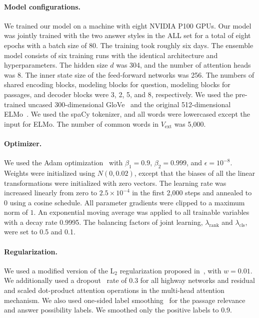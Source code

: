 \documentclass[11pt,a4paper]{article}
\theoremstyle{mydef}
\theoremstyle{myprob}
\begin{document}
\paragraph{Model configurations.}
We trained our model on a machine with eight NVIDIA P100 GPUs. Our model was jointly trained with the two answer styles in the ALL set for a total of eight epochs with a batch size of 80. The training took roughly six days.  The ensemble model consists of six training runs with the identical architecture and hyperparameters.
The hidden size $d$ was 304, and the number of attention heads was 8. The inner state size of the feed-forward networks was 256. The numbers of shared encoding blocks, modeling blocks for question, modeling blocks for passages, and decoder blocks were 3, 2, 5, and 8, respectively. We used the pre-trained uncased 300-dimensional 
GloVe~\citep{PenningtonSM14}
and the original 512-dimensional 
ELMo~\citep{PetersNIGCLZ18}.
We used the spaCy tokenizer, and all words were lowercased except the input for ELMo. The number of common words 
in $V_\mathrm{ext}$
was 5,000.

\paragraph{Optimizer.}
We used the Adam optimization~\citep{KingmaB15} with $\beta_1 = 0.9$, $\beta_2 = 0.999$, and $\epsilon = 10^{-8}$. Weights were initialized using $N(0, 0.02)$, except that the biases of all the linear transformations were initialized with zero vectors. The learning rate was increased linearly from zero to $2.5 \times 10^{-4}$ in the first 2,000 steps and annealed to 0 using a cosine schedule. All parameter gradients were clipped to a maximum norm of $1$. An exponential moving average was applied to all trainable variables with a decay rate 0.9995. The balancing factors of joint learning, $\lambda_\mathrm{rank}$ and $\lambda_\mathrm{cls}$, were set to 0.5 and 0.1.

\paragraph{Regularization.}

We used a modified version of the L$_2$ regularization proposed in~\citep{LoshchilovH17}, with $w = 0.01$.
We additionally used a dropout~\citep{SrivastavaHKSS14} rate of 0.3 for all highway networks and residual and scaled dot-product attention operations in the multi-head attention mechanism. We also used one-sided label smoothing~\citep{SzegedyVISW16} for the passage relevance and answer possibility labels. We smoothed only the positive labels to 0.9.
\end{document}
